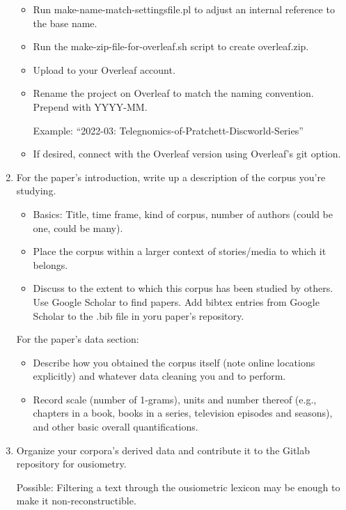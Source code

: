 \begin{enumerate}
\begin{itemize}
    
  \item
    Run
    make-name-match-settingsfile.pl
    to adjust an internal reference to the base name.
  \item
    Run the make-zip-file-for-overleaf.sh script
    to create overleaf.zip.
  \item
    Upload to your Overleaf account.
  \item
    Rename the project on Overleaf to match the naming convention. Prepend with YYYY-MM.

    Example:
    ``2022-03: Telegnomics-of-Pratchett-Discworld-Series''
  \item
    If desired, connect with the Overleaf version using Overleaf's git option.
  \end{itemize}

\item
  For the paper's introduction, write up a description of the corpus you're studying.

  \begin{itemize}
  \item
    Basics: Title, time frame, kind of corpus, number of authors (could be one, could be many).
  \item
    Place the corpus within a larger context of stories/media to which it belongs.
  \item
    Discuss to the extent to which this corpus has been studied by others.
    Use Google Scholar to find papers.
    Add bibtex entries from Google Scholar to the .bib file in yoru paper's repository.
  \end{itemize}

  For the paper's data section:
  \begin{itemize}
  \item
    Describe how you obtained the corpus itself (note online locations explicitly)
    and whatever data cleaning you and to perform.
  \item
    Record scale (number of 1-grams), units and number thereof
    (e.g., chapters in a book, books in a series, television episodes and seasons),
    and other basic overall quantifications.
  \end{itemize}

\item
  Organize your corpora's derived data and contribute it to the Gitlab repository
  for ousiometry.

  Possible: Filtering a text through the ousiometric lexicon may be enough to make it non-reconstructible.


\end{enumerate}
